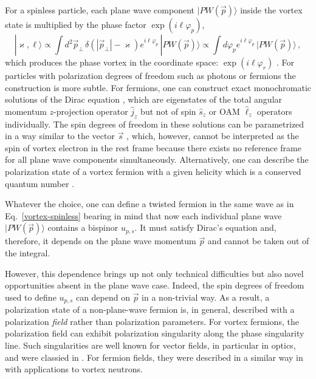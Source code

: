 \documentclass[aps,prd,longbibliography,nofootinbib,amsthm,amsmath,amssymb,amsfonts,notitlepage]{revtex4-1}
\begin{document}
For a spinless particle, each plane wave component $|PW(\vec p)\rangle$ inside the vortex state is multiplied by the
phase factor $\exp(i \ell \varphi_p)$,
\begin{equation}
|\varkappa, \ell\rangle \propto \int d^2 \vec p_\perp\, \delta(|\vec p_\perp|-\varkappa) e^{i \ell \varphi_p}\, |PW(\vec p)\rangle
\propto \int d\varphi_p e^{i \ell \varphi_p}\, |PW(\vec p)\rangle\,,\label{vortex-spinless}
\end{equation}
which produces the phase vortex in the coordinate space: $\exp(i\ell\varphi_r)$ \cite{Jentschura:2010ap, Jentschura:2011ih}.
For particles with polarization degrees of freedom such as photons or fermions the construction is more subtle.
For fermions, one can construct exact monochromatic solutions of the Dirac equation \cite{Bliokh:2011fi, Karlovets:2012eu, Serbo:2015kia},
which are eigenstates of the total angular momentum $z$-projection operator $\hat j_z$
but not of spin $\hat s_z$ or OAM $\hat \ell_z$ operators individually.
The spin degrees of freedom in these solutions can be parametrized in a way similar to the vector $\vec s$ \cite{Bliokh:2011fi},
which, however, cannot be interpreted as the spin of vortex electron in the rest frame because there exists no reference
frame for all plane wave components simultaneously.
Alternatively, one can describe the polarization state of a vortex fermion with a given helicity which is
a conserved quantum number \cite{Karlovets:2012eu, Serbo:2015kia}.

Whatever the choice, one can define a twisted fermion in the same wave as in Eq.~\eqref{vortex-spinless}
bearing in mind that now each individual plane wave $|PW(\vec p)\rangle$ contains a bispinor $u_{p, s}$.
It must satisfy Dirac's equation and, therefore, it depends on the plane wave momentum $\vec p$ and cannot be taken out of the integral.

However, this dependence brings up not only technical difficulties but also novel opportunities
absent in the plane wave case.
Indeed, the spin degrees of freedom used to define $u_{p, s}$ can depend on $\vec p$ in a non-trivial way.
	As a result, a polarization state of a non-plane-wave fermion is, in general, described with a polarization {\em field} rather than polarization parameters.
For vortex fermions, the polarization field can exhibit polarization singularity along the phase singularity line.
Such singularities are well known for vector fields, in particular in optics, and were classied in \cite{Dennis:2002}.
For fermion fields, they were described in a similar way in \cite{Sarenac:2018} with applications to vortex neutrons.
\end{document}
